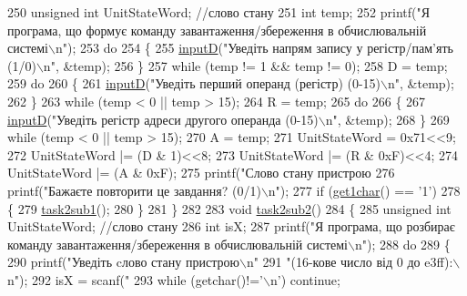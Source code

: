 \begin{DoxyCodeInclude}
{{{{{{250     \textcolor{keywordtype}{unsigned} \textcolor{keywordtype}{int} UnitStateWord; \textcolor{comment}{//слово стану}
251     \textcolor{keywordtype}{int} temp;
252     printf(\textcolor{stringliteral}{"Я програма, що формує команду завантаження/збереження в обчислювальній системі\(\backslash\)n"});
253     \textcolor{keywordflow}{do}
254     \{
255         \hyperlink{main_8c_aa9f623385e5c1c8ac44a985d44cf3c5a}{inputD}(\textcolor{stringliteral}{"Уведіть напрям запису у регістр/пам'ять (1/0)\(\backslash\)n"}, &temp);
256     \}
257     \textcolor{keywordflow}{while} (temp != 1 && temp != 0);
258     D = temp;
259     \textcolor{keywordflow}{do}
260     \{
261         \hyperlink{main_8c_aa9f623385e5c1c8ac44a985d44cf3c5a}{inputD}(\textcolor{stringliteral}{"Уведіть перший операнд (регістр) (0-15)\(\backslash\)n"}, &temp);
262     \}
263     \textcolor{keywordflow}{while} (temp < 0 || temp > 15);
264     R = temp;
265     \textcolor{keywordflow}{do}
266     \{
267         \hyperlink{main_8c_aa9f623385e5c1c8ac44a985d44cf3c5a}{inputD}(\textcolor{stringliteral}{"Уведіть регістр адреси другого операнда (0-15)\(\backslash\)n"}, &temp);
268     \}
269     \textcolor{keywordflow}{while} (temp < 0 || temp > 15);
270     A = temp;
271     UnitStateWord = 0x71<<9;
272     UnitStateWord |= (D & 1)<<8;
273     UnitStateWord |= (R & 0xF)<<4;
274     UnitStateWord |= (A & 0xF);
275     printf(\textcolor{stringliteral}{"Слово стану пристрою %
276     printf(\textcolor{stringliteral}{"Бажаєте повторити це завдання? (0/1)\(\backslash\)n"});
277     \textcolor{keywordflow}{if} (\hyperlink{main_8c_a20531ce01d5668d3c0eafb037eb3c514}{get1char}() == \textcolor{charliteral}{'1'})
278     \{
279         \hyperlink{main_8c_a49562a6161d394ce5f96b6731e07e440}{task2sub1}();
280     \}
281 \}
282 
283 \textcolor{keywordtype}{void} \hyperlink{main_8c_a08a44a4f43367b221db5d4e7b2657623}{task2sub2}()
284 \{
285     \textcolor{keywordtype}{unsigned} \textcolor{keywordtype}{int} UnitStateWord; \textcolor{comment}{//слово стану}
286     \textcolor{keywordtype}{int} isX;
287     printf(\textcolor{stringliteral}{"Я програма, що розбирає команду завантаження/збереження в обчислювальній системі\(\backslash\)n"});
288     \textcolor{keywordflow}{do}
289     \{
290         printf(\textcolor{stringliteral}{"Уведіть cлово стану пристрою\(\backslash\)n"}
291                \textcolor{stringliteral}{"(16-кове число від 0 до e3ff):\(\backslash\)n"});
292         isX = scanf(\textcolor{stringliteral}{"%
293         \textcolor{keywordflow}{while} (getchar()!=\textcolor{charliteral}{'\(\backslash\)n'}) \textcolor{keywordflow}{continue};
}}}}}}}}
\end{DoxyCodeInclude}
